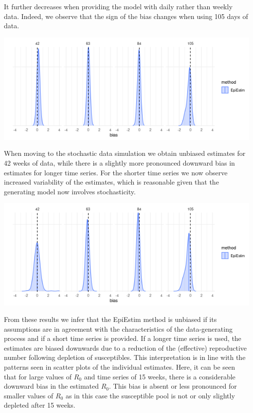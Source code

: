 \documentclass{article}
\begin{document}
It further decreases when providing the model with daily rather than weekly data. Indeed, we observe that the sign of the bias changes when using 105 days of data.

\includegraphics[scale=0.53]{figures/bias_15_daily.png}

When moving to the stochastic data simulation we obtain unbiased estimates for 42 weeks of data, while there is a slightly more pronounced downward bias in estimates for longer time series. For the shorter time series we now observe increased variability of the estimates, which is reasonable given that the generating model now involves stochasticity.

\includegraphics[scale=0.53]{figures/bias_15_daily_stoch.png}

From these results we infer that the EpiEstim method is unbiased if its assumptions are in agreement with the characteristics of the data-generating process and if a short time series is provided. If a longer time series is used, the estimates are biased downwards due to a reduction of the (effective) reproductive number following depletion of susceptibles. This interpretation is in line with the patterns seen in scatter plots of the individual estimates. Here, it can be seen that for large values of $R_0$ and time series of 15 weeks, there is a considerable downward bias in the estimated $R_0$. This bias is absent or less pronounced for smaller values of $R_0$ as in this case the susceptible pool is not or only slightly depleted after 15 weeks.
\end{document}
